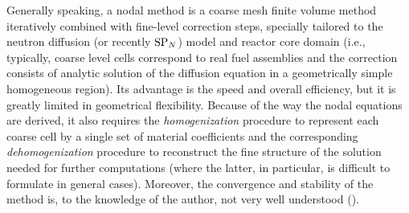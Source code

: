 Generally speaking, a nodal method is a coarse mesh finite volume method iteratively combined with fine-level correction
steps, specially tailored to the neutron diffusion (or recently $\text{SP}_{N}$) model and reactor core domain (i.e., typically, 
coarse level cells correspond to real fuel assemblies and the correction consists of analytic solution of the diffusion equation in a
geometrically simple homogeneous region). Its advantage is the speed and overall efficiency, but it is greatly limited
in geometrical flexibility. Because of the way the nodal equations are derived, it also requires the
\textit{homogenization} procedure to represent each coarse cell by a single set of material coefficients and the 
corresponding \textit{dehomogenization} procedure to reconstruct the fine structure of the solution needed for further 
computations (where the latter, in particular, is difficult to formulate in general cases). Moreover, the convergence
and stability of the method is, to the knowledge of the author, not very well understood (\cite{ZiminComm}).

